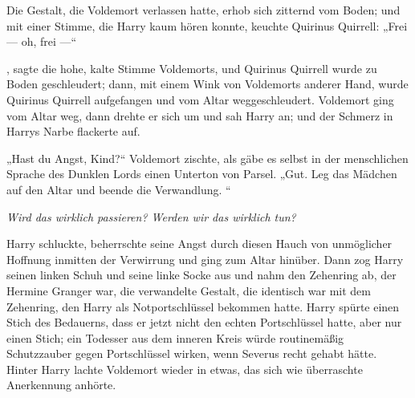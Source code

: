 Die Gestalt, die Voldemort verlassen hatte, erhob sich zitternd vom Boden; und mit einer Stimme, die Harry kaum hören konnte, keuchte Quirinus Quirrell:
„Frei — oh, frei —“

, sagte die hohe, kalte Stimme Voldemorts, und Quirinus Quirrell wurde zu Boden geschleudert; dann, mit einem Wink von Voldemorts anderer Hand, wurde Quirinus Quirrell aufgefangen und vom Altar weggeschleudert.
Voldemort ging vom Altar weg, dann drehte er sich um und sah Harry an; und der Schmerz in Harrys Narbe flackerte auf.

„Hast du Angst, Kind?“ Voldemort zischte, als gäbe es selbst in der menschlichen Sprache des Dunklen Lords einen Unterton von Parsel.
„Gut. Leg das Mädchen auf den Altar und beende die Verwandlung. “

\emph{Wird das wirklich passieren? Werden wir das wirklich tun?}

Harry schluckte, beherrschte seine Angst durch diesen Hauch von unmöglicher Hoffnung inmitten der Verwirrung und ging zum Altar hinüber. Dann zog Harry seinen linken Schuh und seine linke Socke aus und nahm den Zehenring ab, der Hermine Granger war, die verwandelte Gestalt, die identisch war mit dem Zehenring, den Harry als Notportschlüssel bekommen hatte. Harry spürte einen Stich des Bedauerns, dass er jetzt nicht den echten Portschlüssel hatte, aber nur einen Stich; ein Todesser aus dem inneren Kreis würde routinemäßig Schutzzauber gegen Portschlüssel wirken, wenn Severus recht gehabt hätte. Hinter Harry lachte Voldemort wieder in etwas, das sich wie überraschte Anerkennung anhörte.

